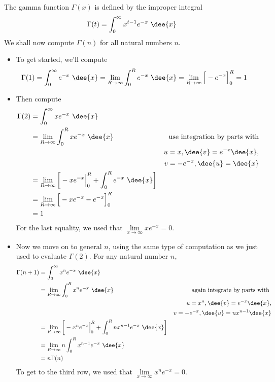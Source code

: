 \begin{eg}\label{eg:IMPgamma}
The gamma function $\Gamma(x)$ is defined by the improper integral
\begin{equation*}
\Gamma(t) = \int_0^\infty x^{t-1}e^{-x}\ \dee{x}
\end{equation*}
We shall now compute $\Gamma(n)$ for all natural numbers $n$.

\begin{itemize}
 \item To get started, we'll compute
\begin{align*}
\Gamma(1) &= \int_0^\infty e^{-x}\ \dee{x}
           = \lim_{R\rightarrow\infty}\int_0^R e^{-x}\ \dee{x}
           = \lim_{R\rightarrow\infty}\Big[-e^{-x}\Big]_0^R
          = 1
\end{align*}
\item Then compute
\begin{align*}
\Gamma(2) &= \int_0^\infty x e^{-x}\ \dee{x}\\
  &=\lim_{R\rightarrow\infty} \int_0^R  x e^{-x}\ \dee{x}
&\text{use integration by parts with}\\
&&  u=x, \dee{v}=e^{-x}\dee{x},\\
&& v=-e^{-x}, \dee{u}=\dee{x} \\
%
  & = \lim_{R\rightarrow\infty}\bigg[- xe^{-x} \Big|_0^R
                                 + \int_0^R  e^{-x}\ \dee{x}\bigg] \\
          & = \lim_{R\rightarrow\infty}\Big[- xe^{-x} - e^{-x}\Big]_0^R \\
          & = 1
\end{align*}
For the last equality, we used that
$\lim\limits_{x\rightarrow\infty}x e^{-x}=0$.

\item Now we move on to general $n$, using the same type of computation as we
just used to evaluate $\Gamma(2)$. For any natural number $n$,
\begin{align*}
\Gamma(n+1)
  &= \int_0^\infty x^n e^{-x}\ \dee{x}\\
  &=\lim_{R\rightarrow\infty} \int_0^R  x^n e^{-x}\ \dee{x}
  &\text{again integrate by parts with }\\
  &&u=x^n,\dee{v}= e^{-x}\dee{x},\\
  &&v=-e^{-x}, \dee{u}=nx^{n-1}\dee{x}\\
  & = \lim_{R\rightarrow\infty}\bigg[- x^ne^{-x}\Big|_0^R +
		  \int_0^R  nx^{n-1}e^{-x}\ \dee{x}\bigg] \\
          & = \lim_{R\rightarrow\infty} n\int_0^R  x^{n-1} e^{-x}\ \dee{x} \\
          & = n\Gamma(n)
\end{align*}
To get to the third row, we used that
$\lim\limits_{x\rightarrow\infty}x^n e^{-x}=0$.


\end{itemize}
\end{eg}
